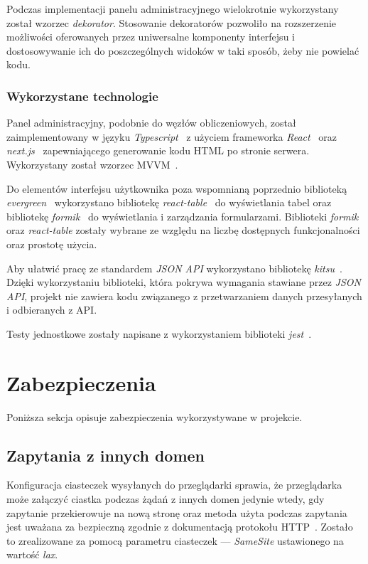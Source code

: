 \documentclass[a4paper,11pt,twoside]{report}
\theoremstyle{definition}
\begin{document}
Podczas implementacji panelu administracyjnego wielokrotnie wykorzystany został wzorzec \textit{dekorator}. Stosowanie dekoratorów pozwoliło na rozszerzenie możliwości oferowanych przez uniwersalne komponenty interfejsu i dostosowywanie ich do poszczególnych widoków w taki sposób, żeby nie powielać kodu.


\subsubsection{Wykorzystane technologie}
Panel administracyjny, podobnie do węzłów obliczeniowych, został zaimplementowany w języku \textit{Typescript}~\cite{typescript} z użyciem frameworka \textit{React}~\cite{react} oraz \textit{next.js}~\cite{next.js} zapewniającego generowanie kodu HTML po stronie serwera. Wykorzystany został wzorzec MVVM~\cite{mvvm}.

Do elementów interfejsu użytkownika poza wspomnianą poprzednio biblioteką \textit{evergreen}~\cite{evergreen} wykorzystano bibliotekę \textit{react-table}~\cite{react-table} do wyświetlania tabel oraz bibliotekę \textit{formik}~\cite{formik} do wyświetlania i zarządzania formularzami. Biblioteki \textit{formik} oraz \textit{react-table} zostały wybrane ze względu na liczbę dostępnych funkcjonalności oraz prostotę użycia.

Aby ułatwić pracę ze standardem \textit{JSON API} wykorzystano bibliotekę \textit{kitsu}~\cite{kitsu}.
Dzięki wykorzystaniu biblioteki, która pokrywa wymagania stawiane przez \textit{JSON API}, projekt nie zawiera kodu związanego z przetwarzaniem danych przesyłanych i odbieranych z API.

Testy jednostkowe zostały napisane z wykorzystaniem biblioteki \textit{jest}~\cite{jest}.


\section{Zabezpieczenia}
\label{zabezpieczenia}

Poniższa sekcja opisuje zabezpieczenia wykorzystywane w projekcie.

\subsection{Zapytania z innych domen}

Konfiguracja ciasteczek wysyłanych do przeglądarki sprawia, że przeglądarka może załączyć ciastka podczas żądań z innych domen jedynie wtedy, gdy zapytanie przekierowuje na nową stronę oraz metoda użyta podczas zapytania jest uważana za bezpieczną zgodnie z dokumentacją protokołu HTTP~\cite{rfc-7231}.
Zostało to zrealizowane za pomocą parametru ciasteczek --- \textit{SameSite} ustawionego na wartość \textit{lax}.
\end{document}
